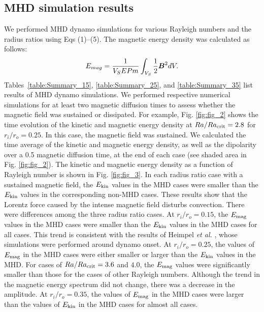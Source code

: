 \subsection{MHD simulation results}

We performed MHD dynamo simulations for various Rayleigh numbers and the radius ratios using Eqs (1)--(5). The magnetic energy density was calculated as follows:
%
\begin{equation}
E_{mag} = \frac{1}{V_{S}E Pm} \int_{V_{S}} \frac{1}{2} \mbox{\boldmath$B$}^{2} dV.
\label{eq:magnetic_energy}
\end{equation}
%
Tables~\ref{table:Summary_15}, \ref{table:Summary_25}, and \ref{table:Summary_35} list results of MHD dynamo simulations. 
We performed respective numerical simulations for at least two magnetic diffusion times to assess whether the magnetic field was sustained or dissipated. 
For example, Fig. \ref{fig:fig_2} shows the time evolution of the kinetic and magnetic energy density at $Ra/Ra_{\rm crit} = 2.8$ for $r_i/r_o = 0.25$. 
In this case, the magnetic field was sustained. 
We calculated the time average of the kinetic and magnetic energy density, as well as the dipolarity over a 0.5 magnetic diffusion time, at the end of each case (see shaded area in Fig. \ref{fig:fig_2}). The kinetic and magnetic energy density as a function of Rayleigh number is shown in Fig. \ref{fig:fig_3}.
In each radius ratio case with a sustained magnetic field, the $E_{\rm kin}$ values in the MHD cases were smaller than the $E_{\rm kin}$ values in the corresponding non-MHD cases. 
These results show that the Lorentz force caused by the intense magnetic field disturbs convection.
There were differences among the three radius ratio cases. 
At $r_i/r_o = 0.15$, the $E_{\rm mag}$ values in the MHD cases were smaller than the $E_{\rm kin}$ values in the MHD cases for all cases. 
This trend is consistent with the results of Heimpel {\it et al.} , whose simulations were performed around dynamo onset. 
At $r_i/r_o = 0.25$, the values of $E_{\rm mag}$ in the MHD cases were either smaller or larger than the $E_{\rm kin}$ values in the MHD. For cases of $Ra/Ra_{\rm crit}  = 3.6$ and $4.0$, the $E_{\rm mag}$ values were significantly smaller than those for the cases of other Rayleigh numbers. 
Although the trend in the magnetic energy spectrum did not change, there was a decrease in the amplitude. At $r_i/r_o = 0.35$, the values of $E_{\rm mag}$ in the MHD cases were larger than the values of $E_{\rm kin}$ in the MHD cases for almost all cases. 
